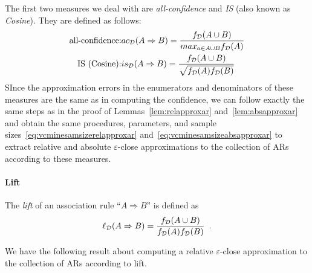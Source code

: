 The first two measures we deal with are \emph{all-confidence} and \emph{IS}
(also known as \emph{Cosine}). They are defined as follows:
\begin{eqnarray*}
  \mbox{all-confidence:} & ac_{\cal D}(A\Rightarrow B)=\frac{f_{\cal D}(A\cup B)}{max_{a\in
  A\cup B}f_{\cal D}(A)}\\
  \mbox{IS (Cosine):} & is_{\cal D}(A\Rightarrow B)=\frac{f_{\cal D}(A\cup
  B)}{\sqrt{f_{\cal D}(A)f_{\cal D}(B)}} 
\end{eqnarray*}
SInce the approximation errors in the enumerators and denominators of these measures are the same as
in computing the confidence, 
we can follow exactly the same
steps as in the proof of Lemmas~\ref{lem:relapproxar} and~\ref{lem:absapproxar} and obtain
 the same procedures, parameters, and sample
sizes~\eqref{eq:vcminesamsizerelapproxar} and~\eqref{eq:vcminesamsizeabsapproxar}  to
extract relative and absolute $\varepsilon$-close approximations to the
collection of ARs according to these measures.

\paragraph{Lift}
The \emph{lift} of an association rule ``$A\Rightarrow B$'' is defined as
\[
\ell_{\cal D}(A\Rightarrow B)=\frac{f_{\cal D}(A\cup B)}{f_{\cal D}(A)f_{\cal D}(B)}\enspace.
\]

We have the following result about computing a relative $\varepsilon$-close
approximation to the collection of ARs according to lift.


